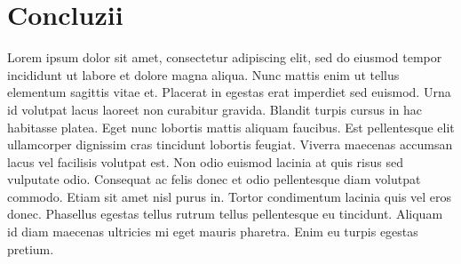 \chapter*{Concluzii} 

Lorem ipsum dolor sit amet, consectetur adipiscing elit, sed do eiusmod tempor incididunt ut labore et dolore magna aliqua. 
Nunc mattis enim ut tellus elementum sagittis vitae et. Placerat in egestas erat imperdiet sed euismod. Urna id volutpat lacus 
laoreet non curabitur gravida. Blandit turpis cursus in hac habitasse platea. Eget nunc lobortis mattis aliquam faucibus. Est 
pellentesque elit ullamcorper dignissim cras tincidunt lobortis feugiat. Viverra maecenas accumsan lacus vel facilisis volutpat est. 
Non odio euismod lacinia at quis risus sed vulputate odio. Consequat ac felis donec et odio pellentesque diam volutpat commodo. 
Etiam sit amet nisl purus in. Tortor condimentum lacinia quis vel eros donec. Phasellus egestas tellus rutrum tellus pellentesque eu 
tincidunt. Aliquam id diam maecenas ultricies mi eget mauris pharetra. Enim eu turpis egestas pretium.
